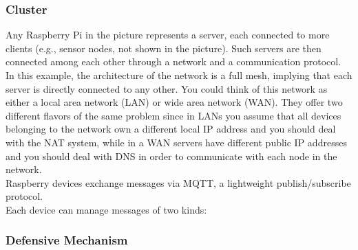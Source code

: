 \subsubsection{Cluster}

\noindent Any Raspberry Pi in the picture represents a server, each connected to more clients (e.g., sensor nodes, not shown in the picture). Such servers are then connected among each other through a network and a communication protocol.\\
In this example, the architecture of the network is a full mesh, implying that each server is directly connected to any other. You could think of this network as either a local area network (LAN) or wide area network (WAN). They offer two different flavors of the same problem since in LANs you assume that all devices belonging to the network own a different local IP address and you should deal with the NAT system, while in a WAN servers have different public IP addresses and you should deal with DNS in order to communicate with each node in the network. \\ 
Raspberry devices exchange messages via MQTT, a lightweight publish/subscribe protocol. \\
Each device can manage messages of two kinds:


\subsubsection{Defensive Mechanism}

